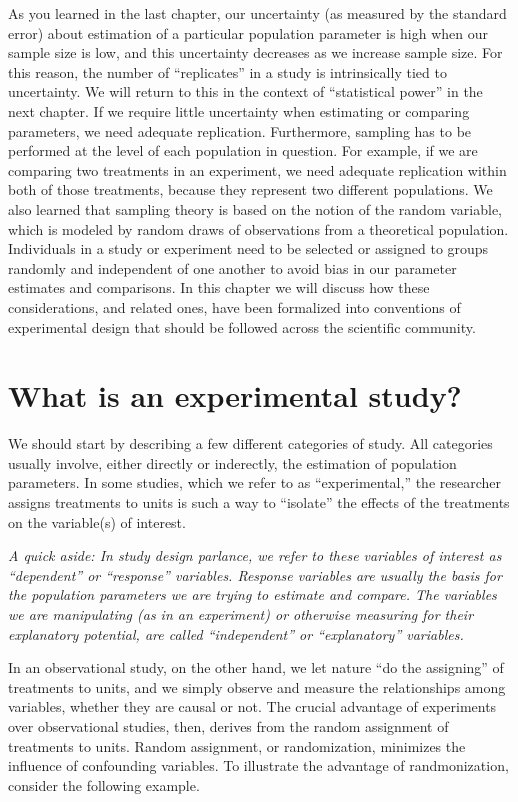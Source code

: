 \documentclass[]{book}
\begin{document}
As you learned in the last chapter, our uncertainty (as measured by the standard error) about estimation of a particular population parameter is high when our sample size is low, and this uncertainty decreases as we increase sample size. For this reason, the number of ``replicates'' in a study is intrinsically tied to uncertainty. We will return to this in the context of ``statistical power'' in the next chapter. If we require little uncertainty when estimating or comparing parameters, we need adequate replication. Furthermore, sampling has to be performed at the level of each population in question. For example, if we are comparing two treatments in an experiment, we need adequate replication within both of those treatments, because they represent two different populations. We also learned that sampling theory is based on the notion of the random variable, which is modeled by random draws of observations from a theoretical population. Individuals in a study or experiment need to be selected or assigned to groups randomly and independent of one another to avoid bias in our parameter estimates and comparisons. In this chapter we will discuss how these considerations, and related ones, have been formalized into conventions of experimental design that should be followed across the scientific community.

\hypertarget{what-is-an-experimental-study}{%
\section{What is an experimental study?}\label{what-is-an-experimental-study}}

We should start by describing a few different categories of study. All categories usually involve, either directly or inderectly, the estimation of population parameters. In some studies, which we refer to as ``experimental,'' the researcher assigns treatments to units is such a way to ``isolate'' the effects of the treatments on the variable(s) of interest.

\emph{A quick aside: In study design parlance, we refer to these variables of interest as ``dependent'' or ``response'' variables. Response variables are usually the basis for the population parameters we are trying to estimate and compare. The variables we are manipulating (as in an experiment) or otherwise measuring for their explanatory potential, are called ``independent'' or ``explanatory'' variables.}

In an observational study, on the other hand, we let nature ``do the assigning'' of treatments to units, and we simply observe and measure the relationships among variables, whether they are causal or not. The crucial advantage of experiments over observational studies, then, derives from the random assignment of treatments to units. Random assignment, or randomization, minimizes the influence of confounding variables. To illustrate the advantage of randmonization, consider the following example.
\end{document}
